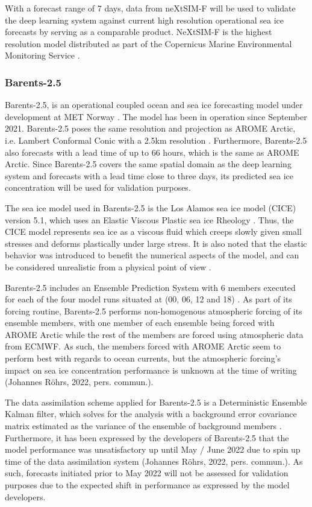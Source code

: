 \documentclass[../main/thesis.tex]{subfiles}
\begin{document}
With a forecast range of 7 days, data from neXtSIM-F will be used to validate the deep learning system against current high resolution operational sea ice forecasts by serving as a comparable product. NeXtSIM-F is the highest resolution model distributed as part of the Copernicus Marine Environmental Monitoring Service \citep{nextsimdata2020}.

\subsubsection{Barents-2.5}
\label{sec:barents}
Barents-2.5, is an operational coupled ocean and sea ice forecasting model under development at MET Norway \citep{Roehrs2022}. The model has been in operation since September 2021. Barents-2.5 poses the same resolution and projection as AROME Arctic, i.e. Lambert Conformal Conic with a 2.5km resolution \citep{Roehrs2022}. Furthermore, Barents-2.5 also forecasts with a lead time of up to 66 hours, which is the same as AROME Arctic. Since Barents-2.5 covers the same spatial domain as the deep learning system and forecasts with a lead time close to three days, its predicted sea ice concentration will be used for validation purposes.

The sea ice model used in Barents-2.5 is the Los Alamos sea ice model (CICE) version 5.1, which uses an Elastic Viscous Plastic sea ice Rheology \citep{Hunke2015}. Thus, the CICE model represents sea ice as a viscous fluid which creeps slowly given small stresses and deforms plastically under large stress. It is also noted that the elastic behavior was introduced to benefit the numerical aspects of the model, and can be considered unrealistic from a physical point of view \citep{Hunke1997}.

Barents-2.5 includes an Ensemble Prediction System with 6 members executed for each of the four model runs situated at (00, 06, 12 and 18) \citep{Roehrs2022}. As part of its forcing routine, Barents-2.5 performs non-homogenous atmospheric forcing of its ensemble members, with one member of each ensemble being forced with AROME Arctic while the rest of the members are forced using atmospheric data from ECMWF. As such, the members forced with AROME Arctic seem to perform best with regards to ocean currents, but the atmospheric forcing's impact on sea ice concentration performance is unknown at the time of writing (Johannes Röhrs, 2022, pers. commun.).

The data assimilation scheme applied for Barents-2.5 is a Deterministic Ensemble Kalman filter, which solves for the analysis with a background error covariance matrix estimated as the variance of the ensemble of background members \citep{Roehrs2022}. Furthermore, it has been expressed by the developers of Barents-2.5 that the model performance was unsatisfactory up until May / June 2022 due to spin up time of the data assimilation system (Johannes Röhrs, 2022, pers. commun.). As such, forecasts initiated prior to May 2022 will not be assessed for validation purposes due to the expected shift in performance as expressed by the model developers.
\end{document}
